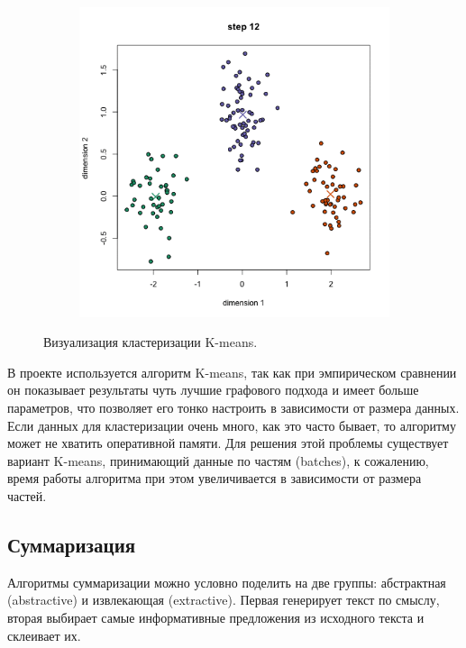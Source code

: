 \documentclass[a4paper, 14pt]{extarticle}
\begin{document}
\begin{figure}[h]
\begin{subfigure}[b]{0.3\textwidth}
		\caption{}
	\end{subfigure}
	~ 
	\begin{subfigure}[b]{0.3\textwidth}
		\includegraphics[width=\textwidth]{k_5}
		\caption{}
	\end{subfigure}
	\caption{Визуализация кластеризации K-means.}
	\label{km}
\end{figure}

В проекте используется алгоритм K-means, так как при эмпирическом сравнении он показывает результаты чуть лучшие графового подхода и имеет больше параметров, что позволяет его тонко настроить в зависимости от размера данных. Если данных для кластеризации очень много, как это часто бывает, то алгоритму может не хватить оперативной памяти. Для решения этой проблемы существует вариант K-means, принимающий данные по частям (batches), к сожалению, время работы алгоритма при этом увеличивается в зависимости от размера частей.



\subsection{Суммаризация}
Алгоритмы суммаризации можно условно поделить на две группы: абстрактная (abstractive) и извлекающая (extractive). Первая генерирует текст по смыслу, вторая выбирает самые информативные предложения из исходного текста и склеивает их.
\end{document}
